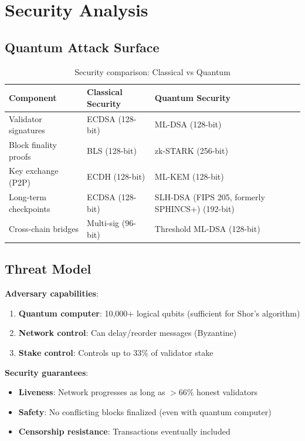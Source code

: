 \section{Security Analysis}


\subsection{Quantum Attack Surface}

\begin{table}[h]
\centering
\begin{tabular}{lll}
\toprule
\textbf{Component} & \textbf{Classical Security} & \textbf{Quantum Security} \\
\midrule
Validator signatures & ECDSA (128-bit) & ML-DSA (128-bit) \\
Block finality proofs & BLS (128-bit) & zk-STARK (256-bit) \\
Key exchange (P2P) & ECDH (128-bit) & ML-KEM (128-bit) \\
Long-term checkpoints & ECDSA (128-bit) & SLH-DSA (FIPS 205, formerly SPHINCS+) (192-bit) \\
Cross-chain bridges & Multi-sig (96-bit) & Threshold ML-DSA (128-bit) \\
\bottomrule
\end{tabular}
\caption{Security comparison: Classical vs Quantum}
\end{table}

\subsection{Threat Model}

\textbf{Adversary capabilities}:
\begin{enumerate}
    \item \textbf{Quantum computer}: 10,000+ logical qubits (sufficient for Shor's algorithm)
    \item \textbf{Network control}: Can delay/reorder messages (Byzantine)
    \item \textbf{Stake control}: Controls up to 33\% of validator stake
\end{enumerate}

\textbf{Security guarantees}:
\begin{itemize}
    \item \textbf{Liveness}: Network progresses as long as $>$66\% honest validators
    \item \textbf{Safety}: No conflicting blocks finalized (even with quantum computer)
    \item \textbf{Censorship resistance}: Transactions eventually included
\end{itemize}

